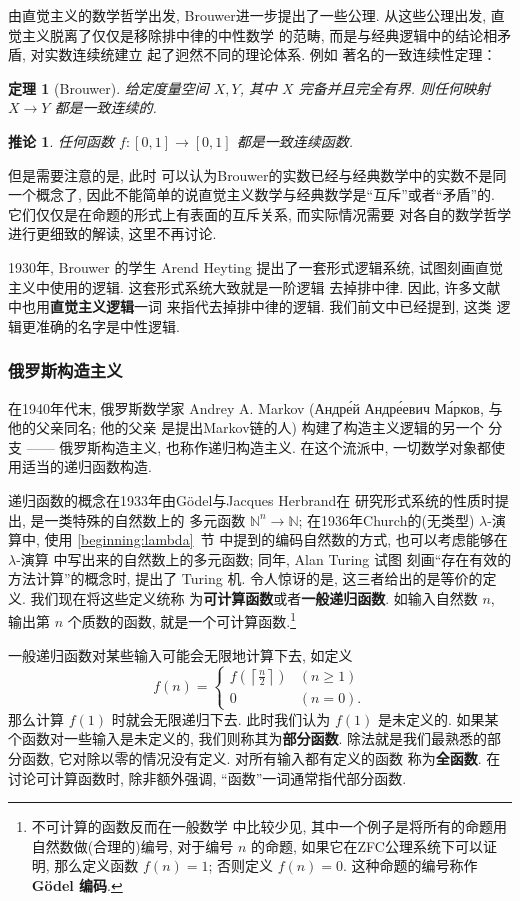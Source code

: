 \documentclass[UTF8]{ctexbook}
\theoremstyle{plain}
\newtheorem{theorem}{定理}[chapter]
\newtheorem{corollary}{推论}[chapter]
\theoremstyle{definition}
\theoremstyle{remark}
\begin{document}
由直觉主义的数学哲学出发, Brouwer进一步提出了一些公理.
从这些公理出发, 直觉主义脱离了仅仅是移除排中律的中性数学
的范畴, 而是与经典逻辑中的结论相矛盾, 对实数连续统建立
起了迥然不同的理论体系. 例如
著名的一致连续性定理：
\begin{theorem}[Brouwer]
给定度量空间 \(X,Y\), 其中 \(X\) 完备并且完全有界.
则任何映射 \(X\to Y\) 都是一致连续的.
\end{theorem}
\begin{corollary}\label{ch:brouwer:funny}
任何函数 \(f : [0,1] \to [0,1]\) 都是一致连续函数.
\end{corollary}
但是需要注意的是, 此时
可以认为Brouwer的实数已经与经典数学中的实数不是同一个概念了,
因此不能简单的说直觉主义数学与经典数学是“互斥”或者“矛盾”的.
它们仅仅是在命题的形式上有表面的互斥关系, 而实际情况需要
对各自的数学哲学进行更细致的解读, 这里不再讨论.

1930年, Brouwer 的学生 Arend Heyting 提出了一套形式逻辑系统,
试图刻画直觉主义中使用的逻辑. 这套形式系统大致就是一阶逻辑
去掉排中律. 因此, 许多文献中也用\textbf{直觉主义逻辑}一词
来指代去掉排中律的逻辑. 我们前文中已经提到, 这类
逻辑更准确的名字是中性逻辑.

\subsubsection{俄罗斯构造主义}

在1940年代末, 俄罗斯数学家 Andrey A. Markov
({\tempfont Андре́й Андре́евич Ма́рков}, 与他的父亲同名; 他的父亲
是提出Markov链的人) 构建了构造主义逻辑的另一个
分支 ------ 俄罗斯构造主义, 也称作递归构造主义.
在这个流派中, 一切数学对象都使用适当的递归函数构造.

递归函数的概念在1933年由G\"odel与Jacques Herbrand在
研究形式系统的性质时提出, 是一类特殊的自然数上的
多元函数 \(\mathbb N^n \to \mathbb N\);
在1936年Church的(无类型) \(\lambda\)-演算中, 使用 \ref{beginning:lambda}~节
中提到的编码自然数的方式, 也可以考虑能够在 \(\lambda\)-演算
中写出来的自然数上的多元函数; 同年, Alan Turing 试图
刻画“存在有效的方法计算”的概念时, 提出了 Turing 机. 令人惊讶的是,
这三者给出的是等价的定义. 我们现在将这些定义统称
为\textbf{可计算函数}或者\textbf{一般递归函数}.
如输入自然数 \(n\), 输出第 \(n\) 个质数的函数,
就是一个可计算函数.\footnote{不可计算的函数反而在一般数学
中比较少见, 其中一个例子是将所有的命题用自然数做(合理的)编号,
对于编号 \(n\) 的命题, 如果它在ZFC公理系统下可以证明,
那么定义函数 \(f(n) = 1\); 否则定义 \(f(n) = 0\).
这种命题的编号称作 \textbf{G\"odel 编码}.}

一般递归函数对某些输入可能会无限地计算下去, 如定义
\[f(n) = \begin{cases}
f\left(\left\lceil \frac n2 \right\rceil\right) & (n \ge 1)\\
0 & (n = 0).
\end{cases}\]
那么计算 \(f(1)\) 时就会无限递归下去. 此时我们认为
\(f(1)\) 是未定义的. 如果某个函数对一些输入是未定义的,
我们则称其为\textbf{部分函数}. 除法就是我们最熟悉的部分函数,
它对除以零的情况没有定义. 对所有输入都有定义的函数
称为\textbf{全函数}. 在讨论可计算函数时, 除非额外强调,
“函数”一词通常指代部分函数.
\end{document}
